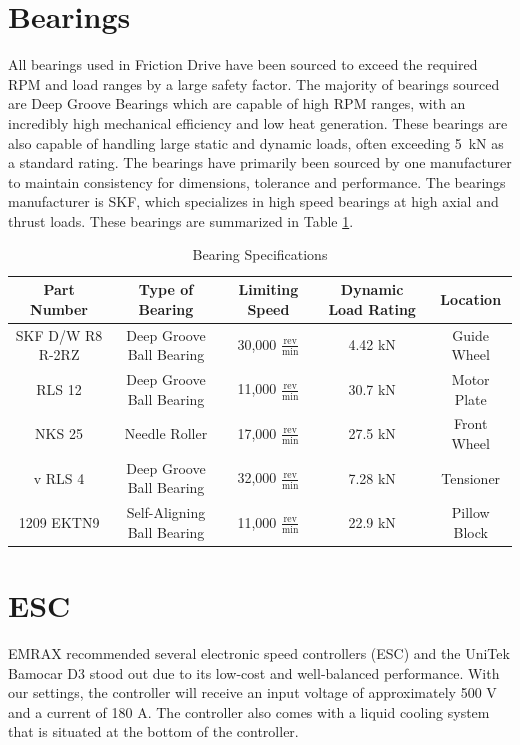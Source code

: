 \documentclass[main.tex]{subfiles}
\begin{document}
\section{Bearings}
All bearings used in Friction Drive have been sourced to exceed the required RPM and load ranges by a large safety factor. The majority of bearings sourced are Deep Groove Bearings which are capable of high RPM ranges, with an incredibly high mechanical efficiency and low heat generation. These bearings are also capable of handling large static and dynamic loads, often exceeding \SI{5}{kN} as a standard rating. The bearings have primarily been sourced by one manufacturer to maintain consistency for dimensions, tolerance and performance. The bearings manufacturer is SKF, which specializes in high speed bearings at high axial and thrust loads. These bearings are summarized in Table \ref{table:bearingtable}.\\

\begin{table}
\centering
  \begin{tabular}{c c c c c} \toprule
    Part Number & Type of Bearing & Limiting Speed & Dynamic Load Rating & Location \\ \midrule
    SKF D/W R8 R-2RZ & Deep Groove Ball Bearing & 30,000 $\frac{\mathrm{rev}}{\mathrm{min}}$ & 4.42 kN & Guide Wheel\\
    RLS 12 & Deep Groove Ball Bearing& 11,000 $\frac{\mathrm{rev}}{\mathrm{min}}$ & 30.7 kN & Motor Plate\\
    NKS 25 & Needle Roller & 17,000 $\frac{\mathrm{rev}}{\mathrm{min}}$ & 27.5 kN & Front Wheel\\
v    RLS 4 & Deep Groove Ball Bearing & 32,000 $\frac{\mathrm{rev}}{\mathrm{min}}$ & 7.28 kN & Tensioner \\
    1209 EKTN9 & Self-Aligning Ball Bearing & 11,000 $\frac{\mathrm{rev}}{\mathrm{min}}$ & 22.9 kN & Pillow Block \\  \bottomrule
  \end{tabular}
  \caption{Bearing Specifications}
  \label{table:bearingtable}
\end{table}

    \section{ESC}
    EMRAX recommended several electronic speed controllers (ESC) and the UniTek Bamocar D3 stood out due to its low-cost and well-balanced performance. With our settings, the controller will receive an input voltage of approximately 500 V and a current of 180 A. The controller also comes with a liquid cooling system that is situated at the bottom of the controller.\\
\end{document}
